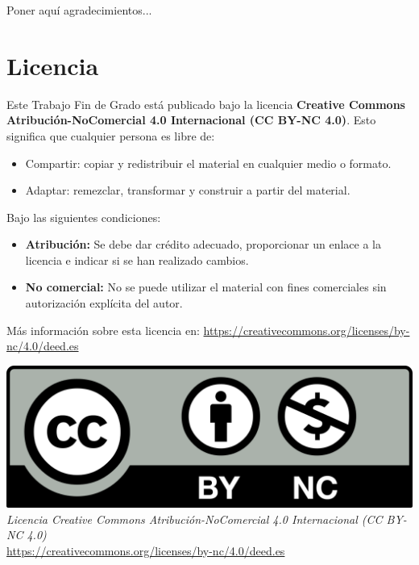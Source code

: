 Poner aquí agradecimientos...


\chapter*{Licencia}

Este Trabajo Fin de Grado está publicado bajo la licencia \textbf{Creative Commons Atribución-NoComercial 4.0 Internacional (CC BY-NC 4.0)}.  
Esto significa que cualquier persona es libre de:

\begin{itemize}
	\item Compartir: copiar y redistribuir el material en cualquier medio o formato.
	\item Adaptar: remezclar, transformar y construir a partir del material.
\end{itemize}

Bajo las siguientes condiciones:

\begin{itemize}
	\item \textbf{Atribución:} Se debe dar crédito adecuado, proporcionar un enlace a la licencia e indicar si se han realizado cambios.
	\item \textbf{No comercial:} No se puede utilizar el material con fines comerciales sin autorización explícita del autor.
\end{itemize}

Más información sobre esta licencia en: \url{https://creativecommons.org/licenses/by-nc/4.0/deed.es}


\begin{center}
	\includegraphics[width=1\textwidth]{imagenes/licencia.png} \\
	\vspace{0.5em}
	\textit{Licencia Creative Commons Atribución-NoComercial 4.0 Internacional (CC BY-NC 4.0)} \\
	\url{https://creativecommons.org/licenses/by-nc/4.0/deed.es}
\end{center}
